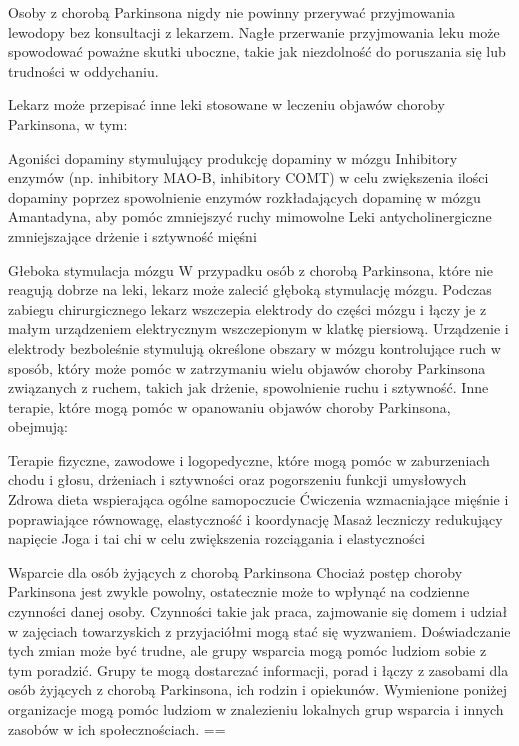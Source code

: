 Osoby z chorobą Parkinsona nigdy nie powinny przerywać przyjmowania lewodopy bez konsultacji z lekarzem. Nagłe przerwanie przyjmowania leku może spowodować poważne skutki uboczne, takie jak niezdolność do poruszania się lub trudności w oddychaniu.

Lekarz może przepisać inne leki stosowane w leczeniu objawów choroby Parkinsona, w tym:

Agoniści dopaminy stymulujący produkcję dopaminy w mózgu
Inhibitory enzymów (np. inhibitory MAO-B, inhibitory COMT) w celu zwiększenia ilości dopaminy poprzez spowolnienie enzymów rozkładających dopaminę w mózgu
Amantadyna, aby pomóc zmniejszyć ruchy mimowolne
Leki antycholinergiczne zmniejszające drżenie i sztywność mięśni

Głeboka stymulacja mózgu
W przypadku osób z chorobą Parkinsona, które nie reagują dobrze na leki, lekarz może zalecić głęboką stymulację mózgu. Podczas zabiegu chirurgicznego lekarz wszczepia elektrody do części mózgu i łączy je z małym urządzeniem elektrycznym wszczepionym w klatkę piersiową. Urządzenie i elektrody bezboleśnie stymulują określone obszary w mózgu kontrolujące ruch w sposób, który może pomóc w zatrzymaniu wielu objawów choroby Parkinsona związanych z ruchem, takich jak drżenie, spowolnienie ruchu i sztywność.
Inne terapie, które mogą pomóc w opanowaniu objawów choroby Parkinsona, obejmują:

Terapie fizyczne, zawodowe i logopedyczne, które mogą pomóc w zaburzeniach chodu i głosu, drżeniach i sztywności oraz pogorszeniu funkcji umysłowych
Zdrowa dieta wspierająca ogólne samopoczucie
Ćwiczenia wzmacniające mięśnie i poprawiające równowagę, elastyczność i koordynację
Masaż leczniczy redukujący napięcie
Joga i tai chi w celu zwiększenia rozciągania i elastyczności


Wsparcie dla osób żyjących z chorobą Parkinsona
Chociaż postęp choroby Parkinsona jest zwykle powolny, ostatecznie może to wpłynąć na codzienne czynności danej osoby. Czynności takie jak praca, zajmowanie się domem i udział w zajęciach towarzyskich z przyjaciółmi mogą stać się wyzwaniem. Doświadczanie tych zmian może być trudne, ale grupy wsparcia mogą pomóc ludziom sobie z tym poradzić. Grupy te mogą dostarczać informacji, porad i łączy z zasobami dla osób żyjących z chorobą Parkinsona, ich rodzin i opiekunów. Wymienione poniżej organizacje mogą pomóc ludziom w znalezieniu lokalnych grup wsparcia i innych zasobów w ich społecznościach.
==

